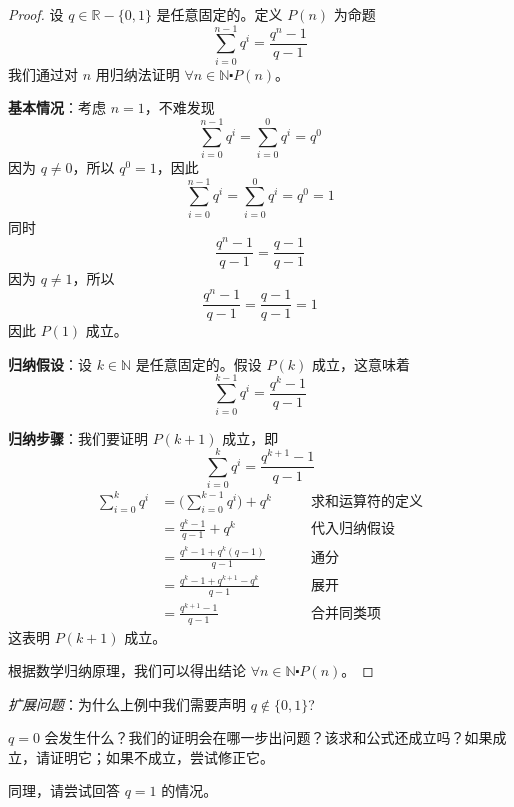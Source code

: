 \begin{proof}
    设 $q \in \mathbb{R}-\{0,1\}$ 是任意固定的。定义 $P(n)$ 为命题
    \[\sum_{i=0}^{n-1}q^i = \frac{q^n-1}{q-1}\]
    我们通过对 $n$ 用归纳法证明 $\forall n \in \mathbb{N} \centerdot P(n)$。

    \textbf{基本情况}：考虑 $n=1$，不难发现
    \[\sum_{i=0}^{n-1}q^i = \sum_{i=0}^{0}q^i = q^0\]
    因为 $q \neq 0$，所以 $q^0=1$，因此
    \[\sum_{i=0}^{n-1}q^i = \sum_{i=0}^{0}q^i = q^0 = 1\]
    同时
    \[\frac{q^n-1}{q-1} = \frac{q-1}{q-1}\]
    因为 $q \neq 1$，所以
    \[\frac{q^n-1}{q-1} = \frac{q-1}{q-1} = 1\]
    因此 $P(1)$ 成立。

    \textbf{归纳假设}：设 $k \in \mathbb{N}$ 是任意固定的。假设 $P(k)$ 成立，这意味着
    \[\sum_{i=0}^{k-1}q^i = \frac{q^k-1}{q-1}\]

    \textbf{归纳步骤}：我们要证明 $P(k+1)$ 成立，即
    \[\sum_{i=0}^{k}q^i = \frac{q^{k+1}-1}{q-1}\]
    \begin{align*}
        \sum_{i=0}^{k}q^i &= \Bigg(\sum_{i=0}^{k-1}q^i\Bigg)+q^k &\qquad \text{求和运算符的定义}\\
        &= \frac{q^k-1}{q-1} + q^k &\qquad \text{代入归纳假设}\\
        &= \frac{q^k-1+q^k(q-1)}{q-1} &\qquad \text{通分}\\
        &= \frac{q^k-1+q^{k+1}-q^k}{q-1} &\qquad \text{展开}\\ 
        &= \frac{q^{k+1}-1}{q-1} &\qquad \text{合并同类项}
    \end{align*}
    这表明 $P(k+1)$ 成立。

    根据数学归纳原理，我们可以得出结论 $\forall n \in \mathbb{N} \centerdot P(n)$。
\end{proof}

\emph{扩展问题}：为什么上例中我们需要声明 $q \notin \{0, 1\}$?

$q=0$ 会发生什么？我们的证明会在哪一步出问题？该求和公式还成立吗？如果成立，请证明它；如果不成立，尝试修正它。

同理，请尝试回答 $q=1$ 的情况。

